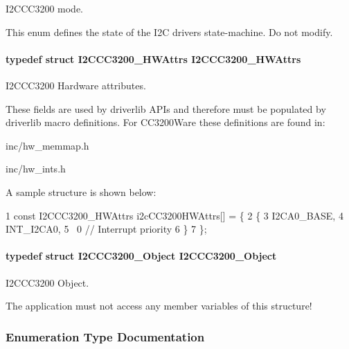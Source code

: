 I2\+C\+C\+C3200 mode. 

This enum defines the state of the I2\+C driver\textquotesingle{}s state-\/machine. Do not modify. 
\paragraph[{I2\+C\+C\+C3200\+\_\+\+H\+W\+Attrs}]{\setlength{\rightskip}{0pt plus 5cm}typedef struct {\bf I2\+C\+C\+C3200\+\_\+\+H\+W\+Attrs}  {\bf I2\+C\+C\+C3200\+\_\+\+H\+W\+Attrs}}\label{_i2_c_c_c3200_8h_a684a95a71c6d653f099add355c43a1dd}


I2\+C\+C\+C3200 Hardware attributes. 

These fields are used by driverlib A\+P\+Is and therefore must be populated by driverlib macro definitions. For C\+C3200\+Ware these definitions are found in\+:
\begin{DoxyItemize}
\item inc/hw\+\_\+memmap.\+h
\item inc/hw\+\_\+ints.\+h
\end{DoxyItemize}

A sample structure is shown below\+: 
\begin{DoxyCode}
1 const I2CCC3200\_HWAttrs i2cCC3200HWAttrs[] = \{
2     \{
3         I2CA0\_BASE,
4         INT\_I2CA0,
5         ~0               // Interrupt priority
6     \}
7 \};
\end{DoxyCode}
\paragraph[{I2\+C\+C\+C3200\+\_\+\+Object}]{\setlength{\rightskip}{0pt plus 5cm}typedef struct {\bf I2\+C\+C\+C3200\+\_\+\+Object}  {\bf I2\+C\+C\+C3200\+\_\+\+Object}}\label{_i2_c_c_c3200_8h_aa8410656ed73821e36a81fd1e4c083a8}


I2\+C\+C\+C3200 Object. 

The application must not access any member variables of this structure! 

\subsubsection{Enumeration Type Documentation}
